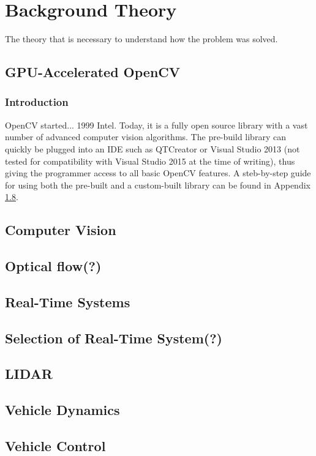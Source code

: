 \section{Background Theory}

The theory that is necessary to understand how the problem was solved.

\subsection{GPU-Accelerated OpenCV}

\subsubsection{Introduction}

OpenCV started... 1999 Intel. Today, it is a fully open source library with a vast number of advanced computer vision algorithms. The pre-build library can quickly be plugged into  an IDE such as QTCreator or Visual Studio 2013 (not tested for compatibility with Visual Studio 2015 at the time of writing), thus giving the programmer access to all basic OpenCV features. A steb-by-step guide for using both the pre-built and a custom-built library can be found in Appendix \ref{}.

\subsection{Computer Vision}

\subsection{Optical flow(?)}

\subsection{Real-Time Systems}

\subsection{Selection of Real-Time System(?)}

\subsection{LIDAR}

\subsection{Vehicle Dynamics}

\subsection{Vehicle Control}

